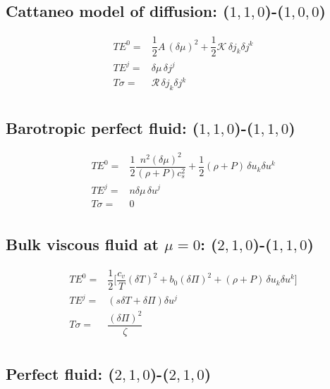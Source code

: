 \documentclass[aps,prl,singlecolumn,nofootinbib]{revtex4-2}
\theoremstyle{definition}
\theoremstyle{theorem}
\begin{document}
\subsection*{Cattaneo model of diffusion: ($1,1,0$)-($1, 0,0$)}

\begin{equation}
\begin{split}
TE^0 ={}& \dfrac{1}{2} A \, (\delta \mu)^2 + \dfrac{1}{2}\mathcal{K}\, \delta j_{k} \delta  j^k \\
TE^j ={}&  \delta \mu \, \delta j^j \\
T\sigma ={}&  \mathcal{R} \, \delta j_{k} \delta  j^k\\
\end{split}
\end{equation}

\subsection*{Barotropic perfect fluid: ($1,1,0$)-($1, 1,0$)}

\begin{equation}
\begin{split}
TE^0 ={}& \dfrac{1}{2} \dfrac{n^2 (\delta \mu)^2 }{(\rho {+} P)c_s^2}+ \dfrac{1}{2} (\rho {+} P) \, \delta u_{k} \delta  u^k \\
TE^j ={}&  n\delta \mu \, \delta u^j \\
T\sigma ={}& 0\\
\end{split}
\end{equation}


\subsection*{Bulk viscous fluid at $\mu=0$: ($2,1,0$)-($1, 1,0$)}

\begin{equation}
\begin{split}
TE^0 ={}& \dfrac{1}{2} \bigg[ \dfrac{c_v}{T} (\delta T)^2 + b_0 (\delta \Pi)^2 + (\rho {+} P)\, \delta u_{k} \delta  u^k \bigg] \\
TE^j ={}&  (s \delta T +\delta \Pi) \delta u^j \\
T\sigma ={}& \dfrac{(\delta \Pi)^2}{\zeta} \\
\end{split}
\end{equation}


\subsection*{Perfect fluid: ($2,1,0$)-($2, 1,0$)}
\end{document}
